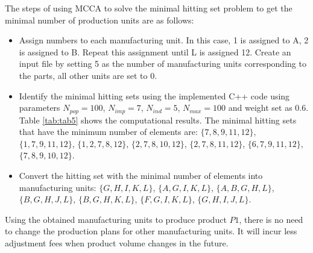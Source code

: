 The steps of using MCCA to solve the minimal hitting set problem to get the minimal number of production units are as follows:
\begin{itemize}
	\item Assign numbers to each manufacturing unit. In this case, 1 is assigned to A, 2 is assigned to B. Repeat this assignment until L is assigned 12. Create an input file by setting 5 as the number of manufacturing units corresponding to the parts, all other units are set to 0.
	\item Identify the minimal hitting sets using the implemented C++ code using parameters $N_{pop} = 100$, $N_{imp} = 7$, $N_{ind} = 5$, $N_{max} = 100$ and weight set as 0.6. Table \ref{tab:tab5} shows the computational results.
	The minimal hitting sets that have the minimum number of elements are: $\{7,8,9,11,12\}$,  $\{1,7,9,11,12\}$, $\{1,2,7,8,12\}$, $\{2,7,8,10,12\}$, $\{2,7,8,11,12\}$, $\{6,7,9,11,12\}$, $\{7,8,9,10,12\}$.
	\item Convert the hitting set with the minimal number of elements into manufacturing units: $\{G,H,I,K,L\}$, $\{A,G,I,K,L\}$, $\{A,B,G,H,L\}$, $\{B,G,H,J,L\}$, $\{B,G,H,K,L\}$, $\{F,G,I,K,L\}$, $\{G,H,I,J,L\}$.
\end{itemize}

Using the obtained manufacturing units to produce product $P1$, there is no need to change the production plans for other manufacturing units.
It will incur less adjustment fees when product volume changes in the future.

